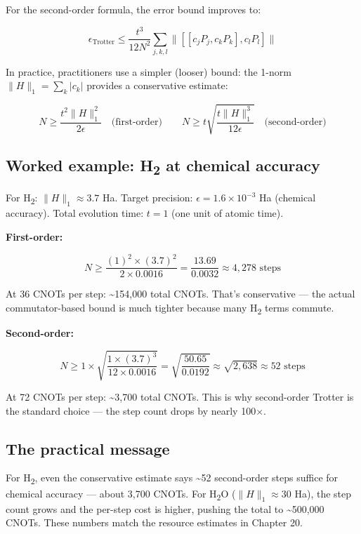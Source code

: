 \documentclass[
  11pt,
  oneside]{book}
\begin{document}
For the second-order formula, the error bound improves to:

\[\epsilon_\text{Trotter} \leq \frac{t^3}{12N^2} \sum_{j,k,l} \lVert [[c_j P_j, c_k P_k], c_l P_l] \rVert\]

In practice, practitioners use a simpler (looser) bound: the 1-norm
\(\lVert H \rVert_1 = \sum_k |c_k|\) provides a conservative estimate:

\[N \geq \frac{t^2 \lVert H \rVert_1^2}{2\epsilon} \quad \text{(first-order)} \qquad N \geq t \sqrt{\frac{t \lVert H \rVert_1^3}{12\epsilon}} \quad \text{(second-order)}\]

\subsection{Worked example: H\textsubscript{2} at chemical
accuracy}\label{worked-example-hux2082-at-chemical-accuracy}

For H\textsubscript{2}: \(\lVert H \rVert_1 \approx 3.7\) Ha. Target precision:
\(\epsilon = 1.6 \times 10^{-3}\) Ha (chemical accuracy). Total
evolution time: \(t = 1\) (one unit of atomic time).

\textbf{First-order:}

\[N \geq \frac{(1)^2 \times (3.7)^2}{2 \times 0.0016} = \frac{13.69}{0.0032} \approx 4{,}278 \text{ steps}\]

At 36 CNOTs per step: \textasciitilde154,000 total CNOTs. That's
conservative --- the actual commutator-based bound is much tighter
because many H\textsubscript{2} terms commute.

\textbf{Second-order:}

\[N \geq 1 \times \sqrt{\frac{1 \times (3.7)^3}{12 \times 0.0016}} = \sqrt{\frac{50.65}{0.0192}} \approx \sqrt{2{,}638} \approx 52 \text{ steps}\]

At 72 CNOTs per step: \textasciitilde3,700 total CNOTs. This is why
second-order Trotter is the standard choice --- the step count drops by
nearly 100$\times$.

\subsection{The practical message}\label{the-practical-message}

For H\textsubscript{2}, even the conservative estimate says \textasciitilde52
second-order steps suffice for chemical accuracy --- about 3,700 CNOTs.
For H\textsubscript{2}O (\(\lVert H \rVert_1 \approx 30\) Ha), the step count grows and
the per-step cost is higher, pushing the total to \textasciitilde500,000
CNOTs. These numbers match the resource estimates in Chapter 20.
\end{document}
